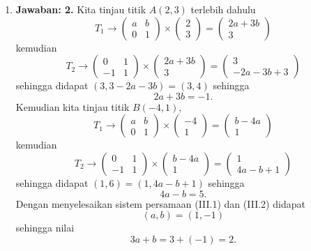 \begin{enumerate}
\item \textbf{Jawaban: 2.} Kita tinjau titik $A(2,3)$ terlebih dahulu $$T_1 \longrightarrow \begin{pmatrix}a & b\\0 & 1\end{pmatrix}\times\begin{pmatrix}2\\3\end{pmatrix} = \begin{pmatrix}2a + 3b\\3\end{pmatrix}$$kemudian$$T_2\longrightarrow \begin{pmatrix}0 & 1\\ -1 & 1\end{pmatrix}\times\begin{pmatrix}2a + 3b\\ 3\end{pmatrix} = \begin{pmatrix}3 \\ -2a-3b+3\end{pmatrix}$$sehingga didapat $(3, 3-2a-3b) = (3,4)$ sehingga \setcounter{equation}{0}\begin{equation}2a+3b = -1.\end{equation} Kemudian kita tinjau titik $B(-4,1)$, $$T_1 \longrightarrow \begin{pmatrix} a & b\\ 0 & 1\end{pmatrix}\times\begin{pmatrix}-4\\1\end{pmatrix} = \begin{pmatrix}b - 4a\\1\end{pmatrix}$$kemudian$$T_2 \longrightarrow \begin{pmatrix} 0&1\\-1&1\end{pmatrix}\times\begin{pmatrix}b-4a\\1\end{pmatrix} = \begin{pmatrix}1 \\ 4a -b +1\end{pmatrix}$$sehingga didapat $(1,6) = (1, 4a-b+1)$ sehingga \begin{equation}4a-b = 5.\end{equation}Dengan menyelesaikan sistem persamaan (III.1) dan (III.2) didapat $$(a,b) = (1,-1)$$ sehingga nilai $$3a+b = 3 + (-1) = 2.$$


\end{enumerate}
